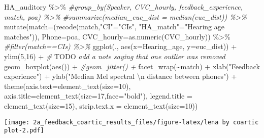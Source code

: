 \documentclass[
]{article}
\newenvironment{Shaded}{\begin{snugshade}}{\end{snugshade}}
\newcommand{\AlertTok}[1]{\textcolor[rgb]{0.94,0.16,0.16}{#1}}
\newcommand{\AttributeTok}[1]{\textcolor[rgb]{0.77,0.63,0.00}{#1}}
\newcommand{\CommentTok}[1]{\textcolor[rgb]{0.56,0.35,0.01}{\textit{#1}}}
\newcommand{\DecValTok}[1]{\textcolor[rgb]{0.00,0.00,0.81}{#1}}
\newcommand{\FunctionTok}[1]{\textcolor[rgb]{0.00,0.00,0.00}{#1}}
\newcommand{\NormalTok}[1]{#1}
\newcommand{\OtherTok}[1]{\textcolor[rgb]{0.56,0.35,0.01}{#1}}
\newcommand{\SpecialCharTok}[1]{\textcolor[rgb]{0.00,0.00,0.00}{#1}}
\newcommand{\StringTok}[1]{\textcolor[rgb]{0.31,0.60,0.02}{#1}}
\begin{document}
\begin{Shaded}
\begin{Highlighting}[]
\NormalTok{ HA\_auditory }\SpecialCharTok{\%\textgreater{}\%}
  \CommentTok{\#group\_by(Speaker, CVC\_hourly, feedback\_experience, match, poa) \%\textgreater{}\%}
  \CommentTok{\#summarize(median\_euc\_dist = median(euc\_dist)) \%\textgreater{}\%}
  \FunctionTok{mutate}\NormalTok{(}\AttributeTok{match=}\NormalTok{(}\FunctionTok{recode}\NormalTok{(match,}\StringTok{"CI"}\OtherTok{=}\StringTok{"CIs"}\NormalTok{, }\StringTok{"HA\_match"}\OtherTok{=}\StringTok{"Hearing age matches"}\NormalTok{)),}
         \AttributeTok{Phone=}\NormalTok{poa,}
         \AttributeTok{CVC\_hourly=}\FunctionTok{as.numeric}\NormalTok{(CVC\_hourly)) }\SpecialCharTok{\%\textgreater{}\%}
  \CommentTok{\#filter(match==\textquotesingle{}CIs\textquotesingle{}) \%\textgreater{}\%}
  \FunctionTok{ggplot}\NormalTok{(., }\FunctionTok{aes}\NormalTok{(}\AttributeTok{x=}\NormalTok{Hearing\_age, }\AttributeTok{y=}\NormalTok{euc\_dist)) }\SpecialCharTok{+} 
  \FunctionTok{ylim}\NormalTok{(}\DecValTok{5}\NormalTok{,}\DecValTok{16}\NormalTok{) }\SpecialCharTok{+} \CommentTok{\# }\AlertTok{TODO}\CommentTok{ add a note saying that one outlier was removed}
  \FunctionTok{geom\_boxplot}\NormalTok{(}\FunctionTok{aes}\NormalTok{()) }\SpecialCharTok{+} 
  \CommentTok{\#geom\_jitter() +}
  \FunctionTok{facet\_wrap}\NormalTok{(}\SpecialCharTok{\textasciitilde{}}\NormalTok{match) }\SpecialCharTok{+}
  \FunctionTok{xlab}\NormalTok{(}\StringTok{"Feedback experience"}\NormalTok{) }\SpecialCharTok{+} 
  \FunctionTok{ylab}\NormalTok{(}\StringTok{"Median Mel spectral }\SpecialCharTok{\textbackslash{}n}\StringTok{ distance between phones"}\NormalTok{) }\SpecialCharTok{+} 
  \FunctionTok{theme}\NormalTok{(}\AttributeTok{axis.text=}\FunctionTok{element\_text}\NormalTok{(}\AttributeTok{size=}\DecValTok{10}\NormalTok{),}
      \AttributeTok{axis.title=}\FunctionTok{element\_text}\NormalTok{(}\AttributeTok{size=}\DecValTok{17}\NormalTok{,}\AttributeTok{face=}\StringTok{"bold"}\NormalTok{),}
      \AttributeTok{legend.title =} \FunctionTok{element\_text}\NormalTok{(}\AttributeTok{size=}\DecValTok{15}\NormalTok{),}
      \AttributeTok{strip.text.x =} \FunctionTok{element\_text}\NormalTok{(}\AttributeTok{size=}\DecValTok{10}\NormalTok{)) }
\end{Highlighting}
\end{Shaded}

\texttt{[image: 2a\_feedback\_coartic\_results\_files/figure-latex/lena by coartic plot-2.pdf]}
\end{document}
